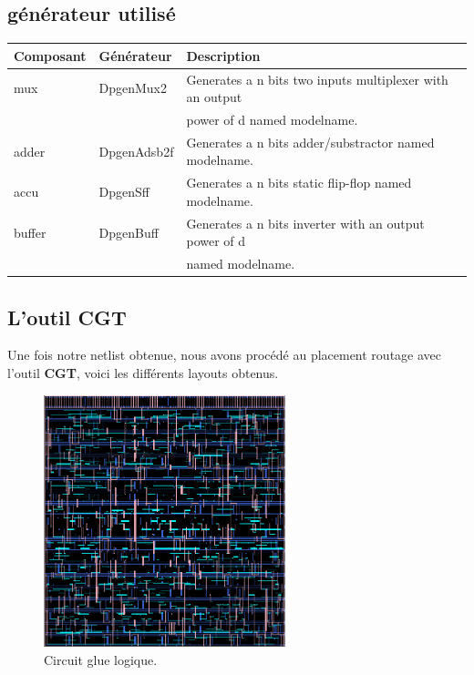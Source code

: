 \documentclass[12pt]{article}
\begin{document}
\subsection{générateur utilisé}
\begin{tabular}{|l|l|l|}
\hline 
Composant & Générateur & Description \\
\hline
mux    &  DpgenMux2   &  Generates a n bits two inputs multiplexer with an output\\ 
       &	      &  power of d named modelname.\\ \hline
adder  &  DpgenAdsb2f &  Generates a n bits adder/substractor named modelname.\\ \hline
accu   &  DpgenSff    &  Generates a n bits static flip-flop named modelname.\\ \hline
buffer &  DpgenBuff   &  Generates a n bits inverter with an output power of d\\
       &              &   named modelname.\\
\hline
\end{tabular}
\subsection {L'outil CGT}
Une fois notre netlist obtenue, nous avons procédé au placement routage avec l'outil \textbf{CGT}, voici les différents layouts obtenus.
\begin{figure}
\begin{center}
  \includegraphics[width = 7cm]{pic/standard.png}
\end{center}
\caption{Circuit glue logique.}
\end{figure}
\end{document}
